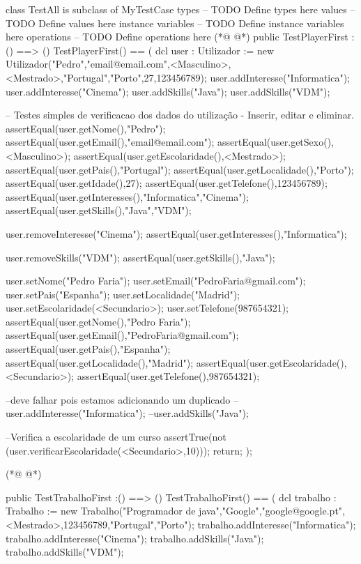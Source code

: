 \begin{vdmpp}[breaklines=true]
class TestAll is subclass of MyTestCase
types
-- TODO Define types here
values
-- TODO Define values here
instance variables
-- TODO Define instance variables here
operations
-- TODO Define operations here
(*@
\label{TestPlayerFirst:10}
@*)
public TestPlayerFirst :() ==> ()
TestPlayerFirst() ==
(
 dcl user : Utilizador := new Utilizador("Pedro","email@email.com",<Masculino>,<Mestrado>,"Portugal","Porto",27,123456789);
 user.addInteresse("Informatica");
 user.addInteresse("Cinema");
 user.addSkills("Java");
 user.addSkills("VDM");
 
 -- Testes simples de verificacao dos dados do utilização - Inserir, editar e eliminar.
 assertEqual(user.getNome(),"Pedro");
 assertEqual(user.getEmail(),"email@email.com");
 assertEqual(user.getSexo(),<Masculino>);
 assertEqual(user.getEscolaridade(),<Mestrado>);
 assertEqual(user.getPais(),"Portugal");
 assertEqual(user.getLocalidade(),"Porto");
 assertEqual(user.getIdade(),27);
 assertEqual(user.getTelefone(),123456789);
 assertEqual(user.getInteresses(),{"Informatica","Cinema"});
 assertEqual(user.getSkills(),{"Java","VDM"});
 
 user.removeInteresse("Cinema");
 assertEqual(user.getInteresses(),{"Informatica"});
 
 user.removeSkills("VDM");
 assertEqual(user.getSkills(),{"Java"});
 
 user.setNome("Pedro Faria");
 user.setEmail("PedroFaria@gmail.com");
 user.setPais("Espanha");
 user.setLocalidade("Madrid");
 user.setEscolaridade(<Secundario>);
 user.setTelefone(987654321);
 assertEqual(user.getNome(),"Pedro Faria");
 assertEqual(user.getEmail(),"PedroFaria@gmail.com");
 assertEqual(user.getPais(),"Espanha");
 assertEqual(user.getLocalidade(),"Madrid");
 assertEqual(user.getEscolaridade(),<Secundario>);
 assertEqual(user.getTelefone(),987654321);
 
 --deve falhar pois estamos adicionando um duplicado
 --user.addInteresse("Informatica");
 --user.addSkills("Java");
 
 --Verifica a escolaridade de um curso
 assertTrue(not (user.verificarEscolaridade(<Secundario>,10)));
 return;
);

(*@
\label{TestTrabalhoFirst:59}
@*)

public TestTrabalhoFirst :() ==> ()
TestTrabalhoFirst() ==
(
 dcl trabalho : Trabalho := new Trabalho("Programador de java","Google","google@google.pt",<Mestrado>,123456789,"Portugal","Porto");
 trabalho.addInteresse("Informatica");
 trabalho.addInteresse("Cinema");
 trabalho.addSkills("Java");
 trabalho.addSkills("VDM");
 

\end{vdmpp}
